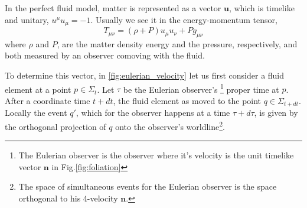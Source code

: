 In the perfect fluid model, matter is represented as a vector $\mathbf{u}$, which is timelike and unitary, $u^\mu u_\mu = -1$. Usually we see it in the energy-momentum tensor,
\begin{equation}
    T_{\mu\nu}=(\rho+P)u_\mu u_\nu + P g_{\mu\nu}
    \label{eqn:fluid_decomposition_energy_tensor}
\end{equation}
where $\rho$ and $P$, are the matter density energy and the pressure, respectively, and both measured by an observer comoving with the fluid.



To determine this vector, in \cref{fig:eulerian_velocity} let us first consider a fluid element at a point $p\in \Sigma_t$.
Let $\tau$ be the Eulerian observer's \footnote{The Eulerian observer is the observer where it's velocity is the unit timelike vector $\mathbf{n}$ in Fig.\ref{fig:foliation}} proper time at $p$.
After a coordinate time $t+dt$, the fluid element as moved to the point $q\in \Sigma_{t+dt}$. Locally the event $q'$, which for the observer happens at a time $\tau + d\tau$, is given by the orthogonal projection of $q$ onto the observer's worldline\footnote{The space of simultaneous events for the Eulerian observer is the space orthogonal to his 4-velocity $\mathbf{n}$.}.

